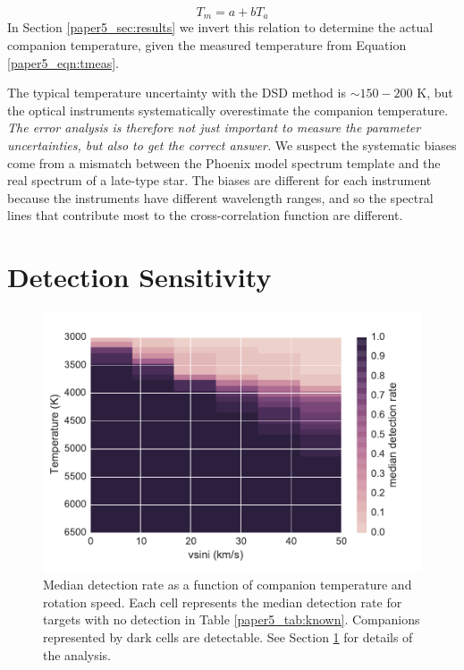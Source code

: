 \begin{equation}
T_m = a + bT_a
\end{equation}
In Section \ref{paper5_sec:results} we invert this relation to determine the actual companion temperature, given the measured temperature from Equation \ref{paper5_eqn:tmeas}.

The typical temperature uncertainty with the DSD method is $\sim 150 - 200$ K, but the optical instruments systematically overestimate the companion temperature. \emph{The error analysis is therefore not just important to measure the parameter uncertainties, but also to get the correct answer.} We suspect the systematic biases come from a mismatch between the Phoenix model spectrum template and the real spectrum of a late-type star. The biases are different for each instrument because the instruments have different wavelength ranges, and so the spectral lines that contribute most to the cross-correlation function are different. 



\section{Detection Sensitivity}
\label{subpaper5_sec:sensitivity}



\begin{figure}
  \centering
  \includegraphics[width=\columnwidth]{Figures/paper5_vsini_temperature_detection_rate_median.pdf}
  \caption{Median detection rate as a function of companion temperature and rotation speed. Each cell represents the median detection rate for targets with no detection in Table \ref{paper5_tab:known}. Companions represented by dark cells are detectable. See Section \ref{subpaper5_sec:sensitivity} for details of the analysis.}
  \label{paper5_fig:sensitivity_2d}
\end{figure}

